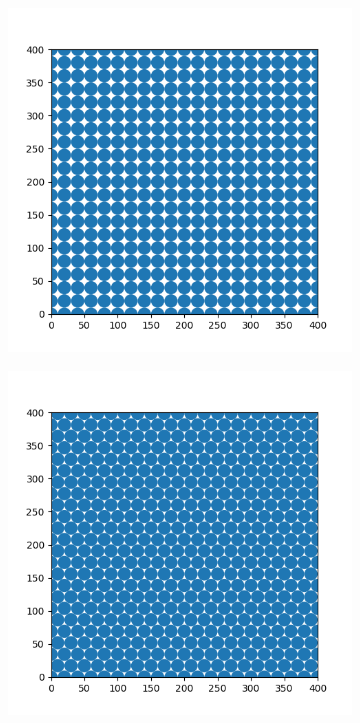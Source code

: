 \documentclass{article}
\begin{document}
\begin{figure}[h]
	\centering
	\begin{subfigure}[t]{0.30\linewidth}
		\centering
		\includegraphics[width = 1.0\linewidth, trim={20 20 20 40}, clip=true]{square.png}
		\label{fig:square}	
	\end{subfigure}
	\hspace{0.16\linewidth}
	\begin{subfigure}[t]{0.30\linewidth}
		\centering
		\includegraphics[width = 1.0\linewidth, trim={20 20 20 40}, clip=true]{hexagonal.png}
		\label{fig:hexagonal}	
	\end{subfigure}
\label{fig:packings}
\caption{}
\end{figure}
\end{document}
